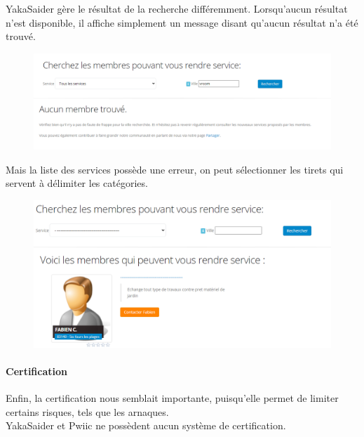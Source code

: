 \documentclass[a4paper,11pt]{article}
\begin{document}
YakaSaider gère le résultat de la recherche différemment. Lorsqu’aucun résultat n’est disponible,
il affiche simplement un message disant qu’aucun résultat n’a été trouvé.\\

\begin{figure}[H]
  \includegraphics[width=\linewidth]{images/pas-trouve-yakasaider.png}
  \label{fig:pas-trouve-yakasaider}
\end{figure}

Mais la liste des services possède une erreur, on peut sélectionner les tirets qui servent à délimiter les catégories.\\

\begin{figure}[H]
  \includegraphics[width=\linewidth]{images/erreur-yakasaider.png}
  \label{fig:erreur-yakasaider}
\end{figure}

\paragraph{Certification}

Enfin, la certification nous semblait importante, puisqu’elle permet de limiter certains risques, tels que les arnaques.\\

YakaSaider et Pwiic ne possèdent aucun système de certification.\\
\end{document}
